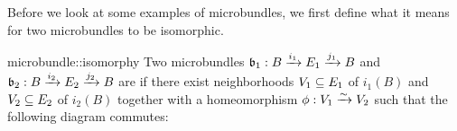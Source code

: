 \begin{myparagraph}
    Before we look at some examples of microbundles,
    we first define what it means for two microbundles to be isomorphic.
\end{myparagraph}

\begin{mydefinition}[isomorphy]{microbundle::isomorphy}{}
    Two microbundles $\bundledef{\bb_1}{B}{E_1}{i_1}{j_1}$ and $\bundledef{\bb_2}{B}{E_2}{i_2}{j_2}$
    are  if there exist neighborhoods $V_1 \sub E_1$ of $i_1(B)$ and $V_2 \sub E_2$ of $i_2(B)$
    together with a homeomorphism $\phi: V_1 \isomto V_2$
    such that the following diagram commutes: 
    \begin{center}
    \end{center}
\end{mydefinition}
